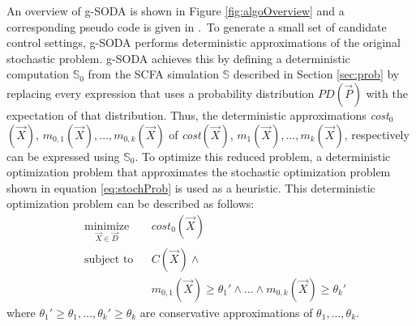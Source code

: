 \documentclass[a4paper, 12pt]{article} %
\begin{document}
An overview of g-SODA is shown in Figure \ref{fig:algoOverview} and a corresponding pseudo code is given in \algoSODAm.~To generate a small set of candidate control settings, g-SODA performs deterministic approximations of the original stochastic problem. 
g-SODA achieves this by defining a deterministic computation $\mathbb{S}_0$ from the SCFA simulation $\mathbb{S}$ described in Section \ref{sec:prob} by replacing every expression that uses a probability distribution $PD(\vec{P})$ with the expectation of that distribution. 
Thus, the deterministic approximations \textit{cost$_0$}$(\vec{X})$, $m_{0,1}(\vec{X}),\dots,m_{0,k}(\vec{X})$ of \textit{cost}$(\vec{X})$, $m_1(\vec{X}),\dots,m_k(\vec{X})$, respectively can be expressed using $\mathbb{S}_0$.
To optimize this reduced problem, a deterministic optimization problem that approximates the stochastic optimization problem shown in equation \ref{eq:stochProb} is used as a heuristic. This deterministic optimization problem can be described as follows:
\begin{equation}
\label{eq:detApprox}
\begin{aligned}
& \underset{\vec{X}\in\vec{D}}{\text{minimize}}
& & \textit{cost}_0(\vec{X}) \\
& \text{subject to}
& & C(\vec{X}) \wedge \\
&&& m_{0,1}(\vec{X})\ge  \theta_1{'}\wedge\dots \wedge m_{0,k}(\vec{X})\ge  \theta_k{'} 
\end{aligned}
\end{equation}
where $\theta_1{'} \ge \theta_1,\dots,\theta_k{'} \ge \theta_k$ are conservative approximations of $\theta_1,\dots,\theta_k$. 
\end{document}
